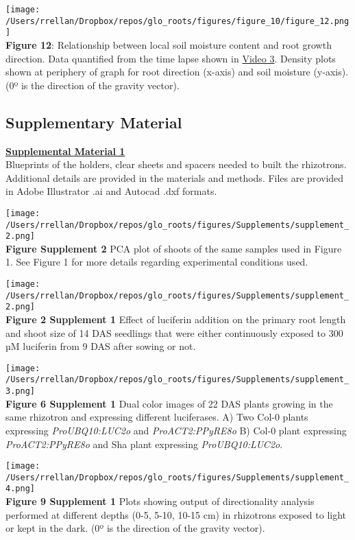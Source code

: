 \documentclass[]{article}
\begin{document}
\texttt{[image: /Users/rrellan/Dropbox/repos/glo\_roots/figures/figure\_10/figure\_12.png]}\\\textbf{Figure
12}: Relationship between local soil moisture content and root growth
direction. Data quantified from the time lapse shown in
\href{https://www.dropbox.com/s/x24x1uhvc8x0ou9/Video_3.avi?dl=0}{Video
3}. Density plots shown at periphery of graph for root direction
(x-axis) and soil moisture (y-axis). (0º is the direction of the gravity
vector).

\subsection{Supplementary Material}\label{supplementary-material}

\textbf{\href{https://www.dropbox.com/s/f01cg10hqehpnv6/supplement_1.zip?dl=0}{Supplemental
Material 1}}\\Blueprints of the holders, clear sheets and spacers needed
to built the rhizotrons. Additional details are provided in the
materials and methods. Files are provided in Adobe Illustrator .ai and
Autocad .dxf formats.

\texttt{[image: /Users/rrellan/Dropbox/repos/glo\_roots/figures/Supplements/supplement\_2.png]}\\\textbf{Figure
Supplement 2} PCA plot of shoots of the same samples used in Figure 1.
See Figure 1 for more details regarding experimental conditions used.

\texttt{[image: /Users/rrellan/Dropbox/repos/glo\_roots/figures/Supplements/supplement\_2.png]}\\\textbf{Figure
2 Supplement 1} Effect of luciferin addition on the primary root length
and shoot size of 14 DAS seedlings that were either continuously exposed
to 300 µM luciferin from 9 DAS after sowing or not.

\texttt{[image: /Users/rrellan/Dropbox/repos/glo\_roots/figures/Supplements/supplement\_3.png]}\\\textbf{Figure
6 Supplement 1} Dual color images of 22 DAS plants growing in the same
rhizotron and expressing different luciferases. A) Two Col-0 plants
expressing \emph{ProUBQ10:LUC2o} and \emph{ProACT2:PPyRE8o} B) Col-0
plant expressing \emph{ProACT2:PPyRE8o} and Sha plant expressing
\emph{ProUBQ10:LUC2o}.

\texttt{[image: /Users/rrellan/Dropbox/repos/glo\_roots/figures/Supplements/supplement\_4.png]}\\\textbf{Figure
9 Supplement 1} Plots showing output of directionality analysis
performed at different depths (0-5, 5-10, 10-15 cm) in rhizotrons
exposed to light or kept in the dark. (0º is the direction of the
gravity vector).
\end{document}
